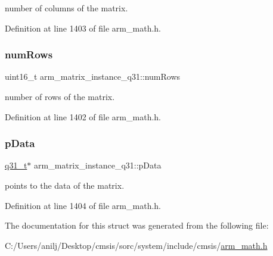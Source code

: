 number of columns of the matrix. 

Definition at line 1403 of file arm\+\_\+math.\+h.

\mbox{\label{structarm__matrix__instance__q31_a63bacac158a821c8cfc06088d251598c}} 
\subsubsection{\texorpdfstring{num\+Rows}{numRows}}
{\footnotesize\ttfamily uint16\+\_\+t arm\+\_\+matrix\+\_\+instance\+\_\+q31\+::num\+Rows}

number of rows of the matrix. 

Definition at line 1402 of file arm\+\_\+math.\+h.

\mbox{\label{structarm__matrix__instance__q31_a09a64267c0579fef086efc9059741e56}} 
\subsubsection{\texorpdfstring{p\+Data}{pData}}
{\footnotesize\ttfamily \hyperlink{arm__math_8h_adc89a3547f5324b7b3b95adec3806bc0}{q31\+\_\+t}$\ast$ arm\+\_\+matrix\+\_\+instance\+\_\+q31\+::p\+Data}

points to the data of the matrix. 

Definition at line 1404 of file arm\+\_\+math.\+h.



The documentation for this struct was generated from the following file\+:\begin{DoxyCompactItemize}
\item 
C\+:/\+Users/anilj/\+Desktop/cmsis/sorc/system/include/cmsis/\hyperlink{arm__math_8h}{arm\+\_\+math.\+h}\end{DoxyCompactItemize}
